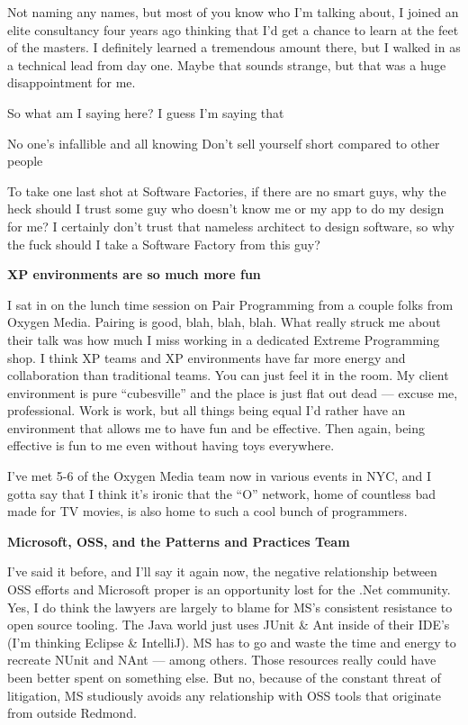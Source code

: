 \documentclass{article}
\begin{document}
{Not naming any names, but most of you know who I'm talking about, I joined an elite consultancy four years ago thinking that I'd get a chance to learn at the feet of the masters.  I definitely learned a tremendous amount there, but I walked in as a technical lead from day one.  Maybe that sounds strange, but that was a huge disappointment for me.

So what am I saying here?  I guess I'm saying that

        No one's infallible and all knowing
        Don't sell yourself short compared to other people

To take one last shot at Software Factories, if there are no smart guys, why the heck should I trust some guy who doesn't know me or my app to do my design for me?  I certainly don't trust that nameless architect to design software, so why the fuck should I take a Software Factory from this guy? 

 
\Large {\textbf {XP environments are so much more fun}}

I sat in on the lunch time session on Pair Programming from a couple folks from Oxygen Media.  Pairing is good, blah, blah, blah.  What really struck me about their talk was how much I miss working in a dedicated Extreme Programming shop.  I think XP teams and XP environments have far more energy and collaboration than traditional teams.  You can just feel it in the room.  My client environment is pure “cubesville” and the place is just flat out dead — excuse me, professional.  Work is work, but all things being equal I'd rather have an environment that allows me to have fun and be effective.  Then again, being effective is fun to me even without having toys everywhere.

I've met 5-6 of the Oxygen Media team now in various events in NYC, and I gotta say that I think it's ironic that the “O” network, home of countless bad made for TV movies, is also home to such a cool bunch of programmers.

 
\Large {\textbf {Microsoft, OSS, and the Patterns and Practices Team}}

I've said it before, and I'll say it again now, the negative relationship between OSS efforts and Microsoft proper is an opportunity lost for the .Net community.  Yes, I do think the lawyers are largely to blame for MS's consistent resistance to open source tooling.  The Java world just uses JUnit \& Ant inside of their IDE's (I'm thinking Eclipse \& IntelliJ).  MS has to go and waste the time and energy to recreate NUnit and NAnt — among others.  Those resources really could have been better spent on something else.  But no, because of the constant threat of litigation, MS studiously avoids any relationship with OSS tools that originate from outside Redmond.

}
\end{document}
